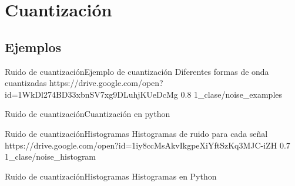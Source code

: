  \section{Cuantización}
 \subsection{Ejemplos}
 \begin{frame}{Ruido de cuantización}{Ejemplo de cuantización}
    Diferentes formas de onda cuantizadas
    {https://drive.google.com/open?id=1WkDl274BD33xbnSV7xg9DLuhjKUeDcMg}
    {0.8}
    {1_clase/noise_examples}
    \vfill
 \end{frame}
 \begin{frame}{Ruido de cuantización}{Cuantización en python}
    \handsonicon
    
    \vfill
 \end{frame}
 \begin{frame}{Ruido de cuantización}{Histogramas}
    Histogramas de ruido para cada señal
    {https://drive.google.com/open?id=1iy8ccMsAkvIkgpeXiYftSzKq3MJC-iZH}
    {0.7}
    {1_clase/noise_histogram}
    \vfill
 \end{frame}
 \begin{frame}{Ruido de cuantización}{Histogramas}
    Histogramas en Python
    \handsonicon
    
    \vfill
 \end{frame}
